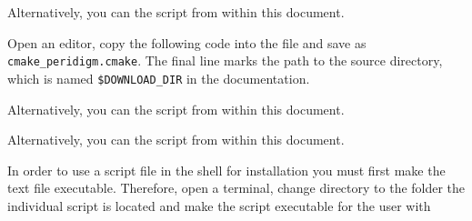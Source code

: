 \begingroup
\lstset{breaklines = true}

\endgroup

\ifpdf
Alternatively, you can  the script from within this document.
\fi

\levelstay{\texorpdfstring{\protect\marktool{\toolname{}}}{\toolname{}}}
\label{sec:Build-script_Peridigm}

\label{sec:Build-script_Peridigm:cmake}

Open an editor, copy the following code into the file and save as \verb+cmake_peridigm.cmake+. The final line marks the path to the \marktool{\toolname} source directory, which is named \verb+$DOWNLOAD_DIR+ in the documentation.

\begingroup
\lstset{breaklines = true}

\endgroup

\ifpdf
Alternatively, you can  the script from within this document.
\fi

\label{sec:Build-script_Peridigm:Cluster}

\begingroup
\lstset{breaklines = true}

\endgroup

\ifpdf
Alternatively, you can  the script from within this document.
\fi

	\label{sec:Build-script_Executable}

In order to use a script file in the shell for installation you must first make the text file executable. Therefore, open a terminal, change directory to the folder the individual script is located and make the script executable for the user with

